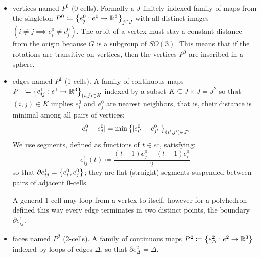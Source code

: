 \documentclass{amsart}
\theoremstyle{plain}
\theoremstyle{definition}
\begin{document}
\begin{itemize}
    \item vertices named $P^0$ (0-cells). Formally a $J$ finitely indexed family of maps from the singleton $P^0\coloneqq\left\{e^0_j:e^0\to \mathbb{R}^3\right\}_{j\in J}$ with all distinct images $(i\neq j\implies e^0_i\neq e^0_j)$. The orbit of a vertex must stay a constant distance from the origin because $G$ is a subgroup of $SO(3)$. This means that if the rotations are transitive on vertices, then the vertices $P^0$ are inscribed in a sphere.
    \item edges named $P^1$ (1-cells). A family of continuous maps $P^1\coloneqq\left\{e^1_{ij}: e^1\to \mathbb{R}^3\right\}_{(i,j)\in K}$ indexed by a subset $K\subseteq J\times J=J^2$ so that $(i,j)\in K$ implies $e^0_i$ and $e^0_j$ are nearest neighbors, that is, their distance is minimal among all pairs of vertices:
    \begin{equation}
        |e^0_i-e^0_j|=\min \left\{|e^0_{i'}-e^0_{j'}|\right\}_{(i',j')\in J^2}
    \end{equation}
    We use segments, defined as functions of $t\in e^1$, satisfying:
    \begin{equation}
        e^1_{ij}(t)\coloneqq\frac{(t+1)e^0_j-(t-1)e^0_i}{2}
    \end{equation}
    so that $\partial e^1_{ij}=\left\{e^0_i, e^0_j\right\}$; they are flat (straight) segments suspended between pairs of adjacent 0-cells.
     
    A general 1-cell may loop from a vertex to itself, however for a polyhedron defined this way every edge terminates in two distinct points, the boundary $\partial e^1_{ij}$.
    \item  faces named $P^2$ (2-cells). A family of continuous maps $P^2\coloneqq\left\{e^2_{\Delta}: e^2\to \mathbb{R}^3\right\}$ indexed by loops of edges $\Delta$, so that $\partial e^2_{\Delta}=\Delta$. 
\end{itemize}
\end{document}
